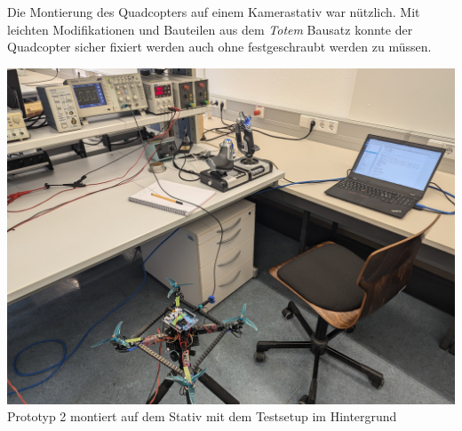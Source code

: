 Die Montierung des Quadcopters auf einem Kamerastativ war nützlich. Mit leichten Modifikationen und Bauteilen aus dem \textit{Totem} Bausatz konnte der Quadcopter sicher fixiert werden auch ohne festgeschraubt werden zu müssen.
\begin{center}
	\includegraphics[scale=0.18]{../images/0087 Testbench.jpg}{\\Prototyp 2 montiert auf dem Stativ mit dem Testsetup im Hintergrund}
\end{center}

